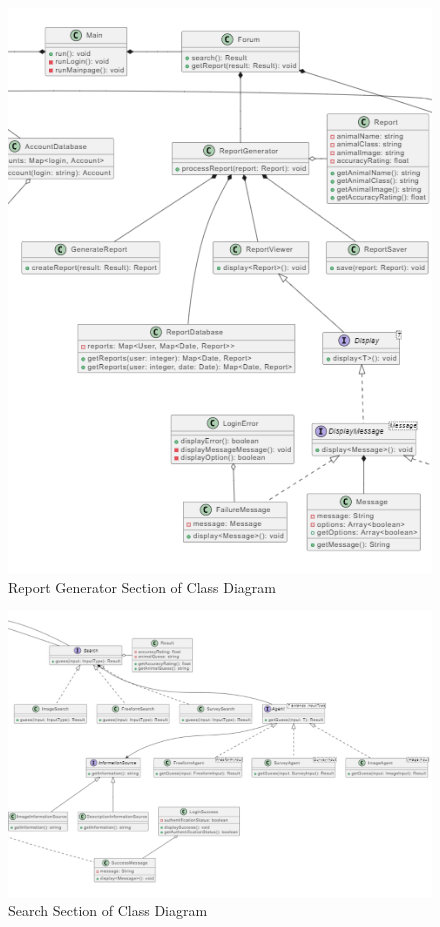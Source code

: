 \documentclass[]{article}
\numberwithin{figure}{section}
\begin{document}
\begin{figure}[h]
    \centering
    \includegraphics[scale=1.5]{reportGenerator_Section4D3_group6_SFWRENG3A04.png}
    \caption{Report Generator Section of Class Diagram}
    \label{fig:accountManager_Section4D3_group6_SFWRENG3A04}
\end{figure}
\clearpage
\begin{figure}[h]
    \centering
    \includegraphics[scale=0.7]{search_Section4D3_group6_SFWRENG3A04.png}
    \caption{Search Section of Class Diagram}
    \label{fig:search_Section4D3_group6_SFWRENG3A04}
\end{figure}
\clearpage
\end{document}
